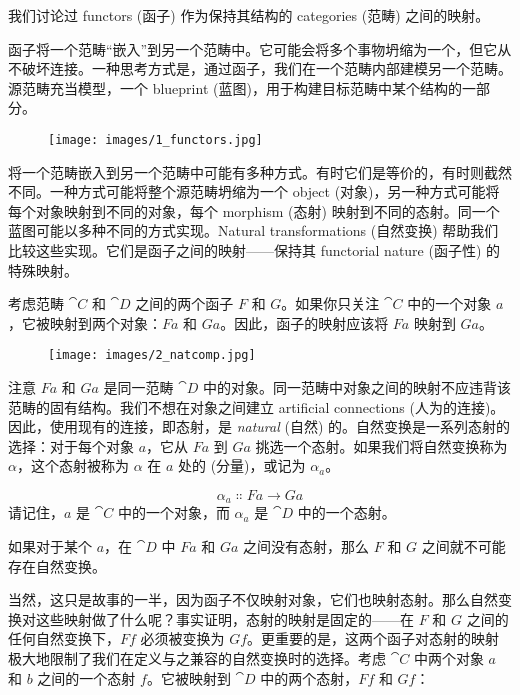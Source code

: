 
\lettrine[lhang=0.17]{我}{们讨论过} functors (函子) 作为保持其结构的 categories (范畴) 之间的映射。

函子将一个范畴“嵌入”到另一个范畴中。它可能会将多个事物坍缩为一个，但它从不破坏连接。一种思考方式是，通过函子，我们在一个范畴内部建模另一个范畴。源范畴充当模型，一个 blueprint (蓝图)，用于构建目标范畴中某个结构的一部分。

\begin{figure}[H]
  \centering\texttt{[image: images/1\_functors.jpg]}
\end{figure}

\noindent
将一个范畴嵌入到另一个范畴中可能有多种方式。有时它们是等价的，有时则截然不同。一种方式可能将整个源范畴坍缩为一个 object (对象)，另一种方式可能将每个对象映射到不同的对象，每个 morphism (态射) 映射到不同的态射。同一个蓝图可能以多种不同的方式实现。Natural transformations (自然变换) 帮助我们比较这些实现。它们是函子之间的映射——保持其 functorial nature (函子性) 的特殊映射。

考虑范畴 $\cat{C}$ 和 $\cat{D}$ 之间的两个函子 $F$ 和 $G$。如果你只关注 $\cat{C}$ 中的一个对象 $a$，它被映射到两个对象：$F a$ 和 $G a$。因此，函子的映射应该将 $F a$ 映射到 $G a$。

\begin{figure}[H]
  \centering
  \texttt{[image: images/2\_natcomp.jpg]}
\end{figure}

\noindent
注意 $F a$ 和 $G a$ 是同一范畴 $\cat{D}$ 中的对象。同一范畴中对象之间的映射不应违背该范畴的固有结构。我们不想在对象之间建立 artificial connections (人为的连接)。因此，使用现有的连接，即态射，是 \emph{natural} (自然) 的。自然变换是一系列态射的选择：对于每个对象 $a$，它从 $F a$ 到 $G a$ 挑选一个态射。如果我们将自然变换称为 $\alpha$，这个态射被称为 $\alpha$ 在 $a$ 处的  (分量)，或记为 $\alpha_a$。

\[\alpha_a \Colon F a \to G a\]
请记住，$a$ 是 $\cat{C}$ 中的一个对象，而 $\alpha_a$ 是 $\cat{D}$ 中的一个态射。

如果对于某个 $a$，在 $\cat{D}$ 中 $F a$ 和 $G a$ 之间没有态射，那么 $F$ 和 $G$ 之间就不可能存在自然变换。

当然，这只是故事的一半，因为函子不仅映射对象，它们也映射态射。那么自然变换对这些映射做了什么呢？事实证明，态射的映射是固定的——在 $F$ 和 $G$ 之间的任何自然变换下，$F f$ 必须被变换为 $G f$。更重要的是，这两个函子对态射的映射极大地限制了我们在定义与之兼容的自然变换时的选择。考虑 $\cat{C}$ 中两个对象 $a$ 和 $b$ 之间的一个态射 $f$。它被映射到 $\cat{D}$ 中的两个态射，$F f$ 和 $G f$：

